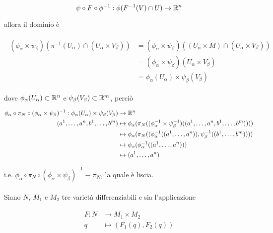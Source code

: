 \begin{equation}
	\psi \circ F \circ \phi^{-1} : \phi(F^{-1}(V) \cap U) \to \mathbb{R}^{n}
\end{equation}

allora il dominio è

\begin{align}
	\begin{split}
		(\phi_{\alpha} \times \psi_{\beta})(\pi^{-1}(U_{\alpha}) \cap (U_{\alpha} \times V_{\beta})) &= (\phi_{\alpha} \times \psi_{\beta})((U_{\alpha} \times M) \cap (U_{\alpha} \times V_{\beta}))\\
		&= (\phi_{\alpha} \times \psi_{\beta})(U_{\alpha} \times V_{\beta})\\
		&= \phi_{\alpha}(U_{\alpha}) \times \psi_{\beta}(V_{\beta})
	\end{split}	
\end{align}

dove $ \phi_{\alpha}(U_{\alpha}) \subset \mathbb{R}^{n} $ e $ \psi_{\beta}(V_{\beta}) \subset \mathbb{R}^{m} $, perciò

\begin{align}
	\begin{split}
		\phi_{\alpha} \circ \pi_{N} \circ (\phi_{\alpha} \times \psi_{\beta})^{-1} : \phi_{\alpha}(U_{\alpha}) \times \psi_{\beta}(V_{\beta}) &\to \mathbb{R}^{n}\\
		(a^{1},\dots,a^{n},b^{1},\dots,b^{m}) &\mapsto \phi_{\alpha} (\pi_{N} ((\phi_{\alpha}^{-1} \times \psi_{\beta}^{-1}) ((a^{1},\dots,a^{n},b^{1},\dots,b^{m}))))\\
		&\mapsto \phi_{\alpha} (\pi_{N} ((\phi_{\alpha}^{-1}((a^{1},\dots,a^{n})),\psi_{\beta}^{-1}((b^{1},\dots,b^{m}))))\\
		&\mapsto \phi_{\alpha} (\phi_{\alpha}^{-1}((a^{1},\dots,a^{n})))\\
		&\mapsto (a^{1},\dots,a^{n})
	\end{split}	
\end{align}

i.e. $ \phi_{\alpha} \circ \pi_{N} \circ (\phi_{\alpha} \times \psi_{\beta})^{-1} \equiv \pi_{N} $, la quale è liscia.\\\\
%
Siano $ N $, $ M_{1} $ e $ M_{2} $ tre varietà differenziabili e sia l'applicazione

\begin{align}
	\begin{split}
		F : N &\to M_{1} \times M_{2}\\
		q &\mapsto (F_{1}(q),F_{2}(q))
	\end{split}
\end{align}

